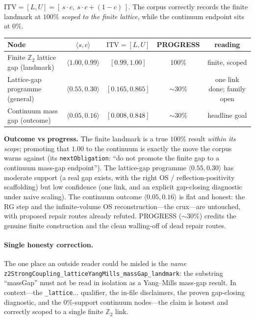 $\mathrm{ITV}=[L,U]=[\,s\cdot c,\ s\cdot c+(1-c)\,]$. The corpus correctly
records the finite landmark at $100\%$ \emph{scoped to the finite lattice}, while
the continuum endpoint sits at $0\%$.

\begin{center}
\begin{tabular}{lcccc}
\hline
Node & $\langle s,c\rangle$ & $\mathrm{ITV}=[L,U]$ & PROGRESS & reading \\
\hline
Finite $\mathbb{Z}_2$ lattice gap (landmark) & $\langle 1.00,0.99\rangle$ & $[0.99,1.00]$ & $100\%$ & finite, scoped \\
Lattice-gap programme (general) & $\langle 0.55,0.30\rangle$ & $[0.165,0.865]$ & $\sim 30\%$ & one link done; family open \\
Continuum mass gap (outcome) & $\langle 0.05,0.16\rangle$ & $[0.008,0.848]$ & $\sim 30\%$ & headline goal \\
\hline
\end{tabular}
\end{center}

\noindent\textbf{Outcome vs progress.} The finite landmark is a true $100\%$
result \emph{within its scope}; promoting that $1.00$ to the continuum is exactly
the move the corpus warns against (its \texttt{nextObligation}: ``do not promote
the finite gap to a continuum mass-gap endpoint''). The lattice-gap programme
$\langle 0.55,0.30\rangle$ has moderate support (a real gap exists, with the
right OS / reflection-positivity scaffolding) but low confidence (one link, and
an explicit gap-closing diagnostic under naive scaling). The continuum outcome
$\langle 0.05,0.16\rangle$ is flat and honest: the RG step and the
infinite-volume OS reconstruction---the crux---are untouched, with proposed
repair routes already refuted. PROGRESS ($\sim 30\%$) credits the genuine finite
construction and the clean walling-off of dead repair routes.

\paragraph{Single honesty correction.}
The one place an outside reader could be misled is the \emph{name}
\texttt{z2StrongCoupling\_latticeYangMills\_massGap\_landmark}: the substring
``massGap'' must not be read in isolation as a Yang--Mills mass-gap result. In
context---the \texttt{\_lattice$\dots$} qualifier, the in-file disclaimers, the
proven gap-closing diagnostic, and the $0\%$-support continuum nodes---the claim
is honest and correctly scoped to a single finite $\mathbb{Z}_2$ link.
